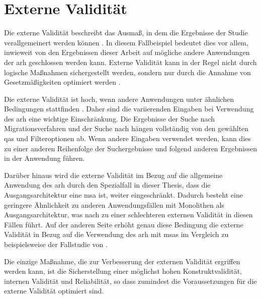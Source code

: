 \section{Externe Validität}

Die externe Validität beschreibt das Ausmaß, in dem die Ergebnisse der Studie verallgemeinert werden können \cite{Runeson2009}. 
In diesem Fallbeispiel bedeutet dies vor allem, inwieweit von den Ergebnissen dieser Arbeit auf mögliche andere Anwendungen der \gls{arh} geschlossen werden kann.
Externe Validität kann in der Regel nicht durch logische Maßnahmen sichergestellt werden, sondern nur durch die Annahme von Gesetzmäßigkeiten optimiert werden \cite{campbell2015experimental}.

Die externe Validität ist hoch, wenn andere Anwendungen unter ähnlichen Bedingungen stattfinden \cite{campbell2015experimental}.
Daher sind die variierenden Eingaben bei Verwendung des \gls{arh} eine wichtige Einschränkung.
Die Ergebnisse der Suche nach Migrationsverfahren und der Suche nach \bpp hängen vollständig von den gewählten \glspl{qa} und Filteroptionen ab.
Wenn andere Eingaben verwendet werden, kann dies zu einer anderen Reihenfolge der Suchergebnisse und folgend anderen Ergebnissen in der Anwendung führen.

Darüber hinaus wird die externe Validität im Bezug auf die allgemeine Anwendung des \gls{arh} durch den Spezialfall in dieser Thesis, dass die Ausgangsarchitektur eine \gls{msa} ist, weiter eingeschränkt.
Dadurch besteht eine geringere Ähnlichkeit zu anderen Anwendungsfällen mit Monolithen als Ausgangsarchitektur, was nach  zu einer schlechteren externen Validität in diesen Fällen führt.
Auf der anderen Seite erhöht genau diese Bedingung die externe Validität in Bezug auf die Verwendung des \gls{arh} mit \glspl{msa} im Vergleich zu beispielsweise der Fallstudie von .

Die einzige Maßnahme, die zur Verbesserung der externen Validität ergriffen werden kann, ist die Sicherstellung einer möglichst hohen Konstruktvalidität, internen Validität und Reliabilität, so dass zumindest die Voraussetzungen für die externe Validität optimiert sind.

